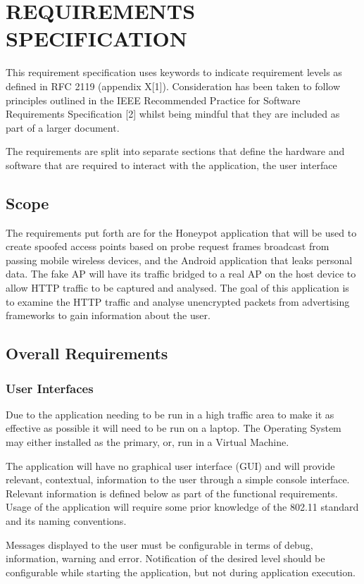 \section{REQUIREMENTS SPECIFICATION}
This requirement specification uses keywords to indicate requirement levels as defined in RFC 2119 (appendix X[1]). Consideration has been taken to follow principles outlined in the IEEE Recommended Practice for Software Requirements Specification [2] whilst being mindful that they are included as part of a larger document.

The requirements are split into separate sections that define the hardware and software that are required to interact with the application, the user interface 


\subsection{Scope}
The requirements put forth are for the Honeypot application that will be used to create spoofed access points based on probe request frames broadcast from passing mobile wireless devices, and the Android application that leaks personal data. The fake AP will have its traffic bridged to a real AP on the host device to allow HTTP traffic to be captured and analysed. The goal of this application is to examine the HTTP traffic and analyse unencrypted packets from advertising frameworks to gain information about the user.

\subsection{Overall Requirements}
\subsubsection{User Interfaces}
Due to the application needing to be run in a high traffic area to make it as effective as possible it will need to be run on a laptop. The Operating System may either installed as the primary, or, run in a Virtual Machine.

The application will have no graphical user interface (GUI) and will provide relevant, contextual, information to the user through a simple console interface. Relevant information is defined below as part of the functional requirements. Usage of the application will require some prior knowledge of the 802.11 standard and its naming conventions.

Messages displayed to the user must be configurable in terms of debug, information, warning and error. Notification of the desired level should be configurable while starting the application, but not during application execution.

